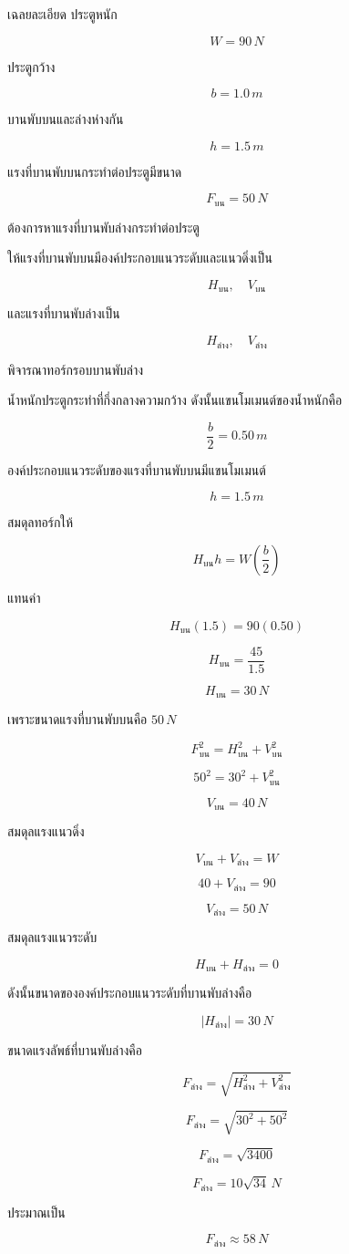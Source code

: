 \begin{examplebox}{เฉลยละเอียด}
ประตูหนัก

\[
W=90\,\si{N}
\]

ประตูกว้าง

\[
b=1.0\,\si{m}
\]

บานพับบนและล่างห่างกัน

\[
h=1.5\,\si{m}
\]

แรงที่บานพับบนกระทำต่อประตูมีขนาด

\[
F_{\text{บน}}=50\,\si{N}
\]

ต้องการหาแรงที่บานพับล่างกระทำต่อประตู

ให้แรงที่บานพับบนมีองค์ประกอบแนวระดับและแนวดิ่งเป็น

\[
H_{\text{บน}},\quad V_{\text{บน}}
\]

และแรงที่บานพับล่างเป็น

\[
H_{\text{ล่าง}},\quad V_{\text{ล่าง}}
\]

พิจารณาทอร์กรอบบานพับล่าง

น้ำหนักประตูกระทำที่กึ่งกลางความกว้าง ดังนั้นแขนโมเมนต์ของน้ำหนักคือ

\[
\frac{b}{2}=0.50\,\si{m}
\]

องค์ประกอบแนวระดับของแรงที่บานพับบนมีแขนโมเมนต์

\[
h=1.5\,\si{m}
\]

สมดุลทอร์กให้

\[
H_{\text{บน}}h=W\left(\frac{b}{2}\right)
\]

แทนค่า

\[
H_{\text{บน}}(1.5)=90(0.50)
\]

\[
H_{\text{บน}}=\frac{45}{1.5}
\]

\[
H_{\text{บน}}=30\,\si{N}
\]

เพราะขนาดแรงที่บานพับบนคือ $50\,\si{N}$

\[
F_{\text{บน}}^2=H_{\text{บน}}^2+V_{\text{บน}}^2
\]

\[
50^2=30^2+V_{\text{บน}}^2
\]

\[
V_{\text{บน}}=40\,\si{N}
\]

สมดุลแรงแนวดิ่ง

\[
V_{\text{บน}}+V_{\text{ล่าง}}=W
\]

\[
40+V_{\text{ล่าง}}=90
\]

\[
V_{\text{ล่าง}}=50\,\si{N}
\]

สมดุลแรงแนวระดับ

\[
H_{\text{บน}}+H_{\text{ล่าง}}=0
\]

ดังนั้นขนาดขององค์ประกอบแนวระดับที่บานพับล่างคือ

\[
|H_{\text{ล่าง}}|=30\,\si{N}
\]

ขนาดแรงลัพธ์ที่บานพับล่างคือ

\[
F_{\text{ล่าง}}
=
\sqrt{H_{\text{ล่าง}}^2+V_{\text{ล่าง}}^2}
\]

\[
F_{\text{ล่าง}}
=
\sqrt{30^2+50^2}
\]

\[
F_{\text{ล่าง}}
=
\sqrt{3400}
\]

\[
F_{\text{ล่าง}}
=
10\sqrt{34}\,\si{N}
\]

ประมาณเป็น

\[
\boxed{F_{\text{ล่าง}}\approx 58\,\si{N}}
\]
\end{examplebox}

